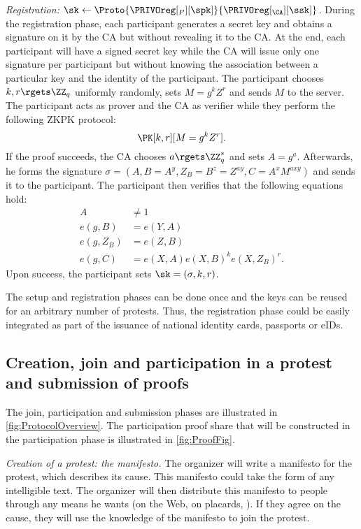 \emph{Registration: \(\sk\gets 
    \Proto{\PRIVOreg[_P][\spk]}{\PRIVOreg[_{\CA}][\ssk]}\).}
During the registration phase, each participant generates a secret key and 
obtains a signature on it by the \ac{CA} but without revealing it to the 
\ac{CA}.
At the end, each participant will have a signed secret key while the \ac{CA} 
will issue only one signature per participant but without knowing the 
association between a particular key and the identity of the participant.
The participant chooses \(k, r\rgets \ZZ_q\) uniformly randomly, sets \(M = g^k Z^r\) and sends \(M\) to the server.
The participant acts as prover and the \ac{CA} as verifier while they perform 
the following \ac{ZKPK} protocol:
\[
  \PK[k,r][M = g^k Z^r].
\]
If the proof succeeds, the \ac{CA} chooses \(a\rgets \ZZ_q^*\) and sets \(A = g^a\).
Afterwards, he forms the signature \(\sigma = (A, B = A^y, Z_B = B^z = Z^{ay}, 
  C = A^x M^{axy})\) and sends it to the participant.
The participant then verifies that the following equations hold:
\begin{align*}
  A &\neq 1 \\
  e(g, B) &= e(Y, A) \\
  e(g, Z_B) &= e(Z, B) \\
  e(g, C) &= e(X, A) e(X, B)^k e(X, Z_B)^r.
\end{align*}
Upon success, the participant sets \(\sk = (\sigma, k, r)\).

The setup and registration phases can be done once and the keys can be reused 
for an arbitrary number of protests.
Thus, the registration phase could be easily integrated as part of the issuance 
of national identity cards, passports or \acp{eID}.

\subsection{Creation, join and participation in a protest and submission of proofs}%
\label{ProtocolDuring}

The join, participation and submission phases are illustrated in \cref{fig:ProtocolOverview}.
The participation proof share that will be constructed in the participation phase is illustrated in \cref{fig:ProofFig}.

\emph{Creation of a protest: the manifesto.}
The organizer will write a manifesto for the protest, which describes its cause.
This manifesto could take the form of any intelligible text.
The organizer will then distribute this manifesto to people through any means he wants (\eg on the Web, on placards, \etc).
If they agree on the cause, they will use the knowledge of the manifesto to join the protest.


